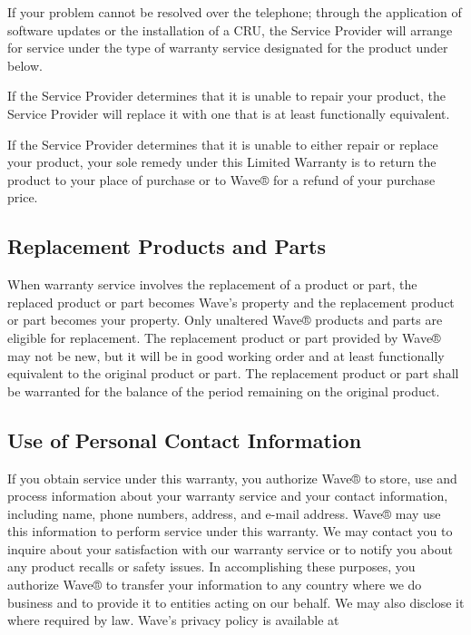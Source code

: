 \documentclass[letterpaper,10pt,openany,oneside,english]{sphinxmanual}
\begin{document}
If your problem cannot be resolved over the telephone; through the application of software updates or the installation of a CRU, the Service Provider will arrange for service under the type of warranty service designated for the product under  below.

If the Service Provider determines that it is unable to repair your product, the Service Provider will replace it with one that is at least functionally equivalent.

If the Service Provider determines that it is unable to either repair or replace your product, your sole remedy under this Limited Warranty is to return the product to your place of purchase or to Wave® for a refund of your purchase price.


\subsection{Replacement Products and Parts}
\label{\detokenize{part1:replacement-products-and-parts}}
When warranty service involves the replacement of a product or part, the replaced product or part becomes Wave’s property and the replacement product or part becomes your property. Only unaltered Wave® products and parts are eligible for replacement. The replacement product or part provided by Wave® may not be new, but it will be in good working order and at least functionally equivalent to the original product or part. The replacement product or part shall be warranted for the balance of the period remaining on the original product.


\subsection{Use of Personal Contact Information}
\label{\detokenize{part1:use-of-personal-contact-information}}
If you obtain service under this warranty, you authorize Wave® to store, use and process information about your warranty service and your contact information, including name, phone numbers, address, and e-mail address. Wave® may use this information to perform service under this warranty. We may contact you to inquire about your satisfaction with our warranty service or to notify you about any product recalls or safety issues. In accomplishing these purposes, you authorize Wave® to transfer your information to any country where we do business and to provide it to entities acting on our behalf. We may also disclose it where required by law. Wave’s privacy policy is available at 
\end{document}
